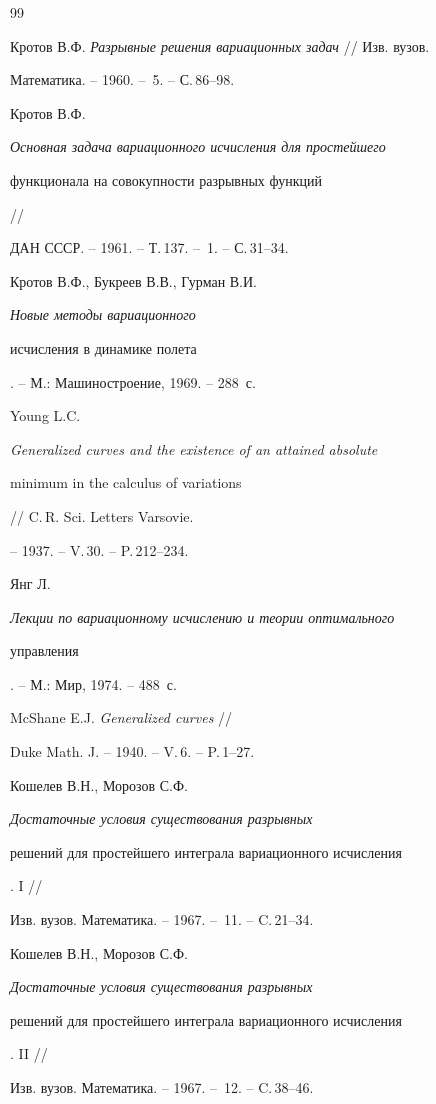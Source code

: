 \begin{thebibliography}{99}







Кротов В.Ф. {\em Разрывные решения вариационных задач} // Изв. вузов.


Математика. -- 1960. -- \No\,5. -- С.\,86--98.




Кротов В.Ф. {\em Основная задача вариационного исчисления для простейшего


функционала на совокупности разрывных функций} //


ДАН СССР. -- 1961. -- Т.\,137. -- \No\,1. -- С.\,31--34.




Кротов В.Ф., Букреев В.В., Гурман В.И. {\em Новые методы вариационного


исчисления в динамике полета}. -- М.: Машиностроение, 1969. -- 288~с.




Young L.C. {\em Generalized curves and the existence of an attained absolute


minimum in the calculus of variations} // C.\,R. Sci. Letters Varsovie.


-- 1937. -- V.\,30. -- P.\,212--234.




Янг Л. {\em Лекции по вариационному исчислению и теории оптимального


управления}. -- М.: Мир, 1974. -- 488~с.




McShane E.J. {\em Generalized curves} //


Duke Math. J. -- 1940. -- V.\,6. -- P.\,1--27.




Кошелев В.Н., Морозов С.Ф. {\em Достаточные условия существования разрывных


решений для простейшего интеграла вариационного исчисления}. I //


Изв. вузов. Математика. -- 1967. -- \No\,11. -- C.\,21--34.




Кошелев В.Н., Морозов С.Ф. {\em Достаточные условия существования разрывных


решений для простейшего интеграла вариационного исчисления}. II //


Изв. вузов. Математика. -- 1967. -- \No\,12. -- C.\,38--46.



\end{thebibliography}
